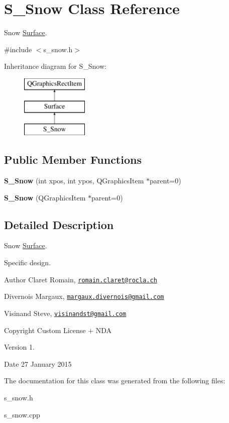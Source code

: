 \hypertarget{class_s___snow}{}\section{S\+\_\+\+Snow Class Reference}
\label{class_s___snow}


Snow \hyperlink{class_surface}{Surface}.  




{\ttfamily \#include $<$s\+\_\+snow.\+h$>$}

Inheritance diagram for S\+\_\+\+Snow\+:\begin{figure}[H]
\begin{center}
\leavevmode
\includegraphics[height=3.000000cm]{class_s___snow}
\end{center}
\end{figure}
\subsection*{Public Member Functions}
\begin{DoxyCompactItemize}
\item 
\hypertarget{class_s___snow_a58b5eb7552b3082d105e9968acc7a9fb}{}{\bfseries S\+\_\+\+Snow} (int xpos, int ypos, Q\+Graphics\+Item $\ast$parent=0)\label{class_s___snow_a58b5eb7552b3082d105e9968acc7a9fb}

\item 
\hypertarget{class_s___snow_a19a17d0be19ecb0f85b1feff5aab697f}{}{\bfseries S\+\_\+\+Snow} (Q\+Graphics\+Item $\ast$parent=0)\label{class_s___snow_a19a17d0be19ecb0f85b1feff5aab697f}

\end{DoxyCompactItemize}


\subsection{Detailed Description}
Snow \hyperlink{class_surface}{Surface}. 

Specific design. \begin{DoxyAuthor}{Author}
Claret Romain, \href{mailto:romain.claret@rocla.ch}{\tt romain.\+claret@rocla.\+ch} 

Divernois Margaux, \href{mailto:margaux.divernois@gmail.com}{\tt margaux.\+divernois@gmail.\+com} 

Visinand Steve, \href{mailto:visinandst@gmail.com}{\tt visinandst@gmail.\+com} 
\end{DoxyAuthor}
\begin{DoxyCopyright}{Copyright}
Custom License + N\+D\+A 
\end{DoxyCopyright}
\begin{DoxyVersion}{Version}
1. 
\end{DoxyVersion}
\begin{DoxyDate}{Date}
27 January 2015 
\end{DoxyDate}


The documentation for this class was generated from the following files\+:\begin{DoxyCompactItemize}
\item 
s\+\_\+snow.\+h\item 
s\+\_\+snow.\+cpp\end{DoxyCompactItemize}

